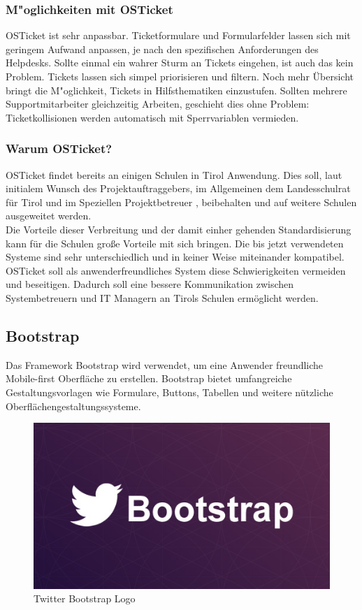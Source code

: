 	\subsubsection{M"oglichkeiten mit OSTicket}
	
	OSTicket ist sehr anpassbar. Ticketformulare und Formularfelder lassen sich mit geringem Aufwand anpassen, je nach den spezifischen Anforderungen des Helpdesks. Sollte einmal ein wahrer Sturm an Tickets eingehen, ist auch das kein Problem. Tickets lassen sich simpel priorisieren und filtern. Noch mehr Übersicht bringt die M"oglichkeit, Tickets in Hilfsthematiken einzustufen. Sollten mehrere Supportmitarbeiter gleichzeitig Arbeiten, geschieht dies ohne Problem: Ticketkollisionen werden automatisch mit Sperrvariablen vermieden.
	
	\subsubsection{Warum OSTicket?}
	OSTicket findet bereits an einigen Schulen in Tirol Anwendung. Dies soll, laut initialem Wunsch des Projektauftraggebers, im Allgemeinen dem Landesschulrat für Tirol und im Speziellen Projektbetreuer \getHammerl , beibehalten und auf weitere Schulen ausgeweitet werden.
	\\
	Die Vorteile dieser Verbreitung und der damit einher gehenden Standardisierung kann für die Schulen große Vorteile mit sich bringen. Die bis jetzt verwendeten Systeme sind sehr unterschiedlich und in keiner Weise miteinander kompatibel. OSTicket soll als anwenderfreundliches System diese Schwierigkeiten vermeiden und beseitigen. Dadurch soll eine bessere Kommunikation zwischen Systembetreuern und IT Managern an Tirols Schulen ermöglicht werden.

	\subsection{Bootstrap}
	Das Framework Bootstrap wird verwendet, um eine Anwender freundliche Mobile-first Oberfläche zu erstellen. Bootstrap bietet umfangreiche Gestaltungsvorlagen wie Formulare, Buttons, Tabellen und weitere nützliche Oberflächengestaltungssysteme.
	
	\begin{figure}[h]
		\centering
		\includegraphics[scale=0.65]{figures/twitter-bootstrap.jpg}
		\caption{Twitter Bootstrap Logo}
		\label{Bootstrap_Logo}
	\end{figure}
	

